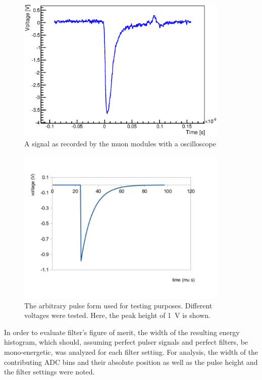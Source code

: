   \begin{figure}
	\centering
	\includegraphics[width = 0.9\textwidth]{graphics/muonModules/monSpec/muonSignal.eps}
	\caption[Muon signal shape]{A signal as recorded by the muon modules with a oscilloscope}
  \end{figure}
	\begin{figure}
	\centering
	\includegraphics[width = 0.9\textwidth]{graphics/muonModules/mainSpec/pinDiode.pdf}
	\caption[Function generator pulse shape]{The arbitrary pulse form used for testing purposes. Different voltages were tested. Here, the peak height of \SI{1}{\volt} is shown.}
  \end{figure}
  
  In order to evaluate filter's figure of merit, the width of the resulting energy histogram, which should, assuming perfect pulser signals and perfect filters, be mono-energetic, was analyzed for each filter setting. For analysis, the width of the contributing ADC bins and their absolute position as well as the pulse height and the filter settings were noted. 
  
